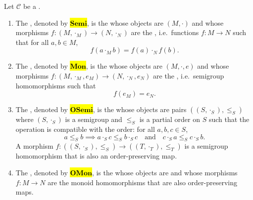 \begin{definition} \label{definition:category_of_semigroups_monoids_ordered_variants}
    Let $\mathcal{C}$ be a .
    \begin{enumerate}
        \item The , denoted by \hl{$\mathbf{Semi}$}, is the   whose objects are  $(M, \cdot)$ and whose morphisms $f : (M, \cdot_M) \to (N, \cdot_N)$ are the , i.e.\ functions $f : M \to N$ such that for all $a, b \in M$,
        $$f(a \cdot_M b) = f(a) \cdot_N f(b).$$

        \item The , denoted by \hl{$\mathbf{Mon}$}, is the   whose objects are  $(M, \cdot, e)$ and whose morphisms $f : (M, \cdot_M, e_M) \to (N, \cdot_N, e_N)$ are the , i.e.\ semigroup homomorphisms such that
        $$f(e_M) = e_N.$$

        \item The , denoted by \hl{$\mathbf{OSemi}$}, is the   whose objects are pairs $((S, \cdot_S), \leq_S)$ where $(S, \cdot_S)$ is a semigroup and $\leq_S$ is a partial order on $S$ such that the operation is compatible with the order: for all $a, b, c \in S$,
        $$a \leq_S b \implies a \cdot_S c \leq_S b \cdot_S c \quad \text{and} \quad c \cdot_S a \leq_S c \cdot_S b.$$
        A morphism $f : ((S, \cdot_S), \leq_S) \to ((T, \cdot_T), \leq_T)$ is a semigroup homomorphism that is also an order-preserving map.

        \item The , denoted by \hl{$\mathbf{OMon}$}, is the   whose objects are  and whose morphisms $f : M \to N$ are the monoid homomorphisms that are also order-preserving maps.
    \end{enumerate}
\end{definition}
